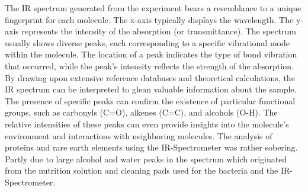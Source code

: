 The IR spectrum generated from the experiment bears a resemblance to a unique fingerprint
for each molecule. The x-axis typically displays the wavelength. The y-axis represents the
intensity of the absorption (or transmittance). The spectrum usually shows diverse peaks,
each corresponding to a specific vibrational mode within the molecule. The location of a peak
indicates the type of bond vibration that occurred, while the peak's intensity reflects the
strength of the absorption.
By drawing upon extensive reference databases and theoretical calculations, the IR spectrum
can be interpreted to glean valuable information about the sample. The presence of specific
peaks can confirm the existence of particular functional groups, such as carbonyls (C=O),
alkenes (C=C), and alcohols (O-H). The relative intensities of these peaks can even provide
insights into the molecule's environment and interactions with neighboring molecules.
The analysis of proteins and rare earth elements using the IR-Spectrometer was rather
sobering. Partly due to large alcohol and water peaks in the spectrum which originated from
the nutrition solution and cleaning pads used for the bacteria and the IR-Spectrometer.
